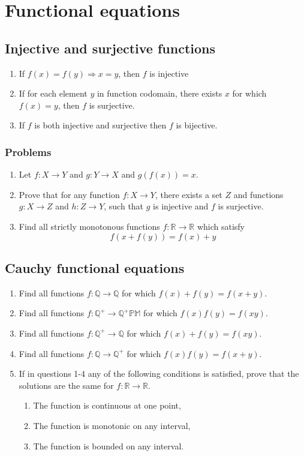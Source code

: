 \documentclass{article}
\begin{document}
\section*{Functional equations}

\subsection*{Injective and surjective functions}
	\begin{enumerate}
		\item 
		If $f(x)=f(y) \Rightarrow x=y$, then $f$ is injective
		\item 
		If for each element $y$ in function codomain, there exists $x$ for which $f(x)=y$, then $f$ is surjective.
		\item
		If $f$ is both injective and surjective then $f$ is bijective.
	\end{enumerate}

	\subsubsection*{Problems}
		\begin{enumerate}
			\item
			Let $f: X \to Y$ and $g: Y \to X$ and $g(f(x))=x$. 
			\item 
			Prove that for any function $f: X \to Y$, there exists a set $Z$ and functions $g: X \to Z$ and $h: Z\to Y$, such that $g$ is injective and $f$ is surjective.
			\item 
			Find all strictly monotonous functions $f: \mathbb{R} \to \mathbb{R}$ which satisfy 
			$$f(x + f(y)) = f(x) + y$$
		\end{enumerate}

	\subsection*{Cauchy functional equations}
		\begin{enumerate}
			\item
			Find all functions $f: \mathbb{Q} \to \mathbb{Q}$ for which $f(x)+f(y)=f(x+y)$.
			\item
			Find all functions $f: \mathbb{Q^+} \to \mathbb{Q^+PM}$ for which $f(x)f(y)=f(xy)$.
			\item
			Find all functions $f: \mathbb{Q^+} \to \mathbb{Q}$ for which $f(x)+f(y)=f(xy)$.
			\item
			Find all functions $f: \mathbb{Q} \to \mathbb{Q^+}$ for which $f(x)f(y)=f(x+y)$.
			\item 
			If in questions 1-4 any of the following conditions is satisfied, prove that the solutions are the same for $f: \mathbb{R} \to \mathbb{R}$.
			\begin{enumerate}
				\item The function is continuous at one point,
				\item The function is monotonic on any interval,
				\item The function is bounded on any interval.
			\end{enumerate}
		\end{enumerate}
\end{document}
